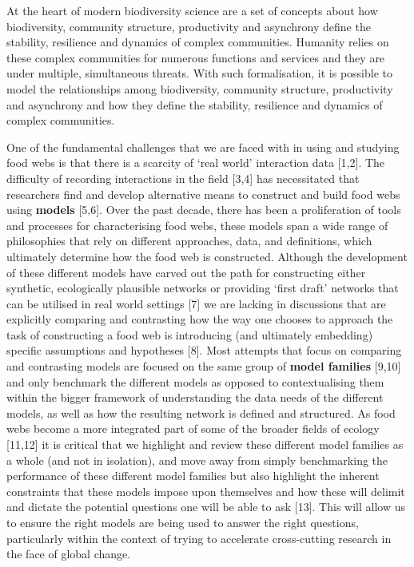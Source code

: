 \documentclass[
]{article}
\begin{document}
At the heart of modern biodiversity science are a set of concepts about
how biodiversity, community structure, productivity and asynchrony
define the stability, resilience and dynamics of complex communities.
Humanity relies on these complex communities for numerous functions and
services and they are under multiple, simultaneous threats. With such
formalisation, it is possible to model the relationships among
biodiversity, community structure, productivity and asynchrony and how
they define the stability, resilience and dynamics of complex
communities.

One of the fundamental challenges that we are faced with in using and
studying food webs is that there is a scarcity of `real world'
interaction data {[}1,2{]}. The difficulty of recording interactions in
the field {[}3,4{]} has necessitated that researchers find and develop
alternative means to construct and build food webs using \textbf{models}
{[}5,6{]}. Over the past decade, there has been a proliferation of tools
and processes for characterising food webs, these models span a wide
range of philosophies that rely on different approaches, data, and
definitions, which ultimately determine how the food web is constructed.
Although the development of these different models have carved out the
path for constructing either synthetic, ecologically plausible networks
or providing `first draft' networks that can be utilised in real world
settings {[}7{]} we are lacking in discussions that are explicitly
comparing and contrasting how the way one chooses to approach the task
of constructing a food web is introducing (and ultimately embedding)
specific assumptions and hypotheses {[}8{]}. Most attempts that focus on
comparing and contrasting models are focused on the same group of
\textbf{model families} {[}9,10{]} and only benchmark the different
models as opposed to contextualising them within the bigger framework of
understanding the data needs of the different models, as well as how the
resulting network is defined and structured. As food webs become a more
integrated part of some of the broader fields of ecology {[}11,12{]} it
is critical that we highlight and review these different model families
as a whole (and not in isolation), and move away from simply
benchmarking the performance of these different model families but also
highlight the inherent constraints that these models impose upon
themselves and how these will delimit and dictate the potential
questions one will be able to ask {[}13{]}. This will allow us to ensure
the right models are being used to answer the right questions,
particularly within the context of trying to accelerate cross-cutting
research in the face of global change.
\end{document}
